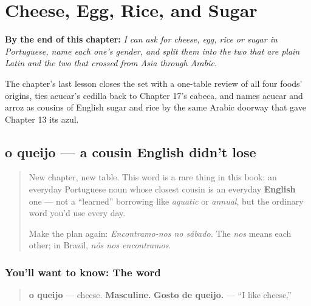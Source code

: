 
\chapter{Cheese, Egg, Rice, and Sugar}
\label{ch:pt-cheese-egg-rice-sugar}

\begin{chapteropening}
\textbf{By the end of this chapter:} \emph{I can ask for cheese, egg, rice or sugar in Portuguese, name each one's gender, and split them into the two that are plain Latin and the two that crossed from Asia through Arabic.}

The chapter's last lesson closes the set with a one-table review of all four foods' origins, ties acucar's cedilla back to Chapter 17's cabeca, and names acucar and arroz as cousins of English sugar and rice by the same Arabic doorway that gave Chapter 13 its azul.
\end{chapteropening}

\section[o queijo]{o queijo — a cousin English didn't lose}

\label{lesson:PT-C24-queijo}



\begin{quote}
New chapter, new table. This word is a rare thing in this book: an everyday Portuguese noun whose closest cousin is an everyday \textbf{English} one — not a \textquotedblleft{}learned\textquotedblright{} borrowing like \emph{aquatic} or \emph{annual}, but the ordinary word you'd use every day.

Make the plan again: \emph{Encontramo-nos no sábado.} The \emph{nos} means each other; in Brazil, \emph{nós nos encontramos}.
\end{quote}

\subsection*{You'll want to know: The word}
\begin{quote}
\textbf{o queijo} — cheese. \textbf{Masculine.} \textbf{Gosto de queijo.} — \textquotedblleft{}I like cheese.\textquotedblright{}
\end{quote}

